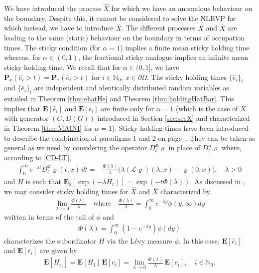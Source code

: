 \documentclass[11pt,a4paper]{article}
\newcommand{\magenta}{black}
\begin{document}
We have introduced the process $\hat{X}$ for which we have an anomalous behaviour on the boundary. Despite this, it cannot be considered to solve the NLBVP for which instead, we have to introduce $\bar{X}$. The different processes $\hat{X}$ and $\bar{X}$ are leading to the same (static) behaviour on the boundary in terms of occupation times. The sticky condition (for $\alpha=1$) implies a finite mean  sticky holding time whereas, for $\alpha \in (0,1)$, the fractional sticky analogue implies an infinite mean sticky holding time. We recall that for $\alpha \in (0,1]$, we have $\mathbf{P}_x(\hat{e}_i >t) = \mathbf{P}_x(\bar{e}_i >t)$ for $i \in \mathbb{N}_0$, $x \in \partial \Omega$. The sticky holding times $\{\hat{e}_i\}_i$ and $\{\bar{e}_i\}_i$ are independent and identically distributed random variables as entailed in Theorem \ref{thm:ehatHe} and Theorem \ref{thm:holdingHatBar}. This implies that $\mathbf{E}[\hat{e}_i]$ and $\mathbf{E}[\bar{e}_i]$ are finite only for $\alpha=1$ (which is the case of $X$ with generator $(G,D(G))$ introduced in Section \ref{sec:secX} and characterized in Theorem \ref{thm:MAINI} for $\alpha=1$). {\color{\magenta} Sticky holding times have been introduced to describe the combination of paradigms 1 and 2 on page~\pageref{sec:comparisonXhatX}.} They can be taken as general as we need by considering the operator $D^\Phi_t \varrho$ in place of $D^\alpha_t \varrho$ where, according to \eqref{CD-LT}, 
\begin{align}
\int_0^\infty e^{-\lambda t} D^\Phi_t \varrho(t,x)\, dt 
= & \frac{\Phi(\lambda)}{\lambda} \big(\lambda (\mathcal{L}\varrho)(\lambda, x) - \varrho(0, x) \big), \quad \lambda>0
\label{genCD}
\end{align}
and $H$ is such that $\mathbf{E}_0[\exp(-\lambda H_t)] = \exp(- t \Phi(\lambda))$.
As discussed in \cite{CapDovDelRus17}, we may consider sticky holding times for $\hat{X}$ and $\bar{X}$ characterized by
\begin{align*}
\lim_{\lambda \to 0} \frac{\Phi(\lambda)}{\lambda} \quad \textrm{where} \quad \frac{\Phi(\lambda)}{\lambda} = \int_0^\infty e^{-\lambda y} \phi(y, \infty) dy
\end{align*} 
written in terms of the tail of $\phi$ and
\begin{align*}
\Phi(\lambda) = \int_0^\infty (1- e^{-\lambda y}) \phi(dy)
\end{align*}
characterizes the subordinator $H$ via the L\'{e}vy measure $\phi$. In this case, $\mathbf{E}[\hat{e}_i]$ and $\mathbf{E}[\bar{e}_i]$ are given by
\begin{align}
\mathbf{E}[H_{e_i}] = \mathbf{E}[H_1]\, \mathbf{E}[e_i] = \lim_{\lambda \to 0} \frac{\Phi(\lambda)}{\lambda}\, \mathbf{E}[e_i], \quad i \in \mathbb{N}_0.
\label{InfinteMeanH}
\end{align}
\end{document}
